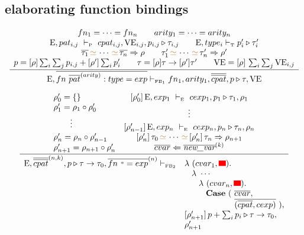 \documentclass[11pt,a4paper]{article}
\newcommand{\key}[1]{\textrm{\textbf{#1}}}
\newcommand{\qualtype}[2]{#1 \triangleright #2}
\newcommand{\unifylist}[3]{#1\,{\color{brown}{\simeq}}\,\cdots\,{\color{brown}{\simeq}}\,#2 \Rightarrow #3}
\newcommand{\subst}[2]{[#1]\,#2}
\newcommand{\braced}[1]{\{#1\}}
\newcommand{\wildcard}{{\color{gray}\scriptstyle\textbf{*}}}
\newcommand{\compose}[2]{#1 \circ #2}
\newcommand{\Env}  {\textrm{E}}
\newcommand{\VE}   {\textrm{VE}}
\newcommand{\sType} {\textrm{\tiny T}}
\newcommand{\sFB}   {\textrm{\tiny FB}}
\newcommand{\lam}  {\mathbf\lambda}
\newcommand{\Empty}{\braced{}}
\newcommand{\vdashE}  {\ \vdash_{\textrm{\tiny E}}\  }
\newcommand{\vdashP}  {\ \vdash_{\textrm{\tiny P}}\  }
\newcommand{\corenew}[1]{\textit{new\_#1}}
\newcommand{\vect}[1]{\overline{#1}}
\newcommand{\TODO}{{\color{red}\rule{2ex}{1.5ex}}}
\begin{document}
\subsection{elaborating function bindings}
\[
\cfrac
 {\begin{array}{c}
  fn_1=\cdots=fn_n \qquad arity_1=\cdots=arity_n                                \\
  \Env,pat_{i,j}  \vdashP  cpat_{i,j},\VE_{i,j},\qualtype{p_{i,j}}{\tau_{i,j}}  \qquad
  \Env,type_i \vdash_\sType \qualtype{p_i'}{\tau_i'}                            \\
  \unifylist{\vect{\tau_1}}{\vect{\tau_n}}{\rho}                                \qquad
  \unifylist{\tau_1'}{\tau_n'}{\rho'}                                           \\
  p = [\rho]\sum_i\sum_j p_{i,j} + [\rho']\sum_i p_i' \qquad
  \tau = [\rho]\tau\to[\rho']\tau'          \qquad
  \VE = \subst{\rho}{\sum_i \sum_j \VE_{i,j}}
  \end{array}}
 {\Env, \vect{fn\ \vect{pat}^{(arity)}:type = exp} \vdash_{\sFB_1} 
  fn_1, arity_1, \vect{\vect{cpat}},\qualtype{p}{\tau},\VE}
\]

\[
\cfrac
 {\begin{array}{lc}
  \rho'_0 = \Empty 
  & \subst{\rho'_0}\Env, exp_1 \vdashE cexp_1,\qualtype{p_1}{\tau_1},\rho_1 \\
  \rho'_1 = \compose{\rho_1}{\rho'_0} & \multirow{2}{*}{\vdots} \\
  \multirow{2}{*}{\qquad\vdots}  &  \\
  & \subst{\rho'_{n-1}}\Env, exp_n \vdashE cexp_n,\qualtype{p_n}{\tau_n},\rho_n \\
  \rho'_n = \compose{\rho_n}{\rho'_{n-1}}
  & \unifylist{\subst{\rho'_n}{\tau_0}}{\subst{\rho'_n}{\tau_n}}{\rho_{n+1}} \\ 
  \rho'_{n+1} = \compose{\rho_{n+1}}{\rho'_n}
  & \vect{cvar} \Leftarrow \vect{\corenew{var}}^{(k)} \\
  \end{array}
 }
 {\begin{array}{ll}
  \Env,\vect{\vect{cpat}}^{(n,k)},\qualtype{p}{\tau\to\tau_0},\vect{fn\ \wildcard = exp}^{(n)} \vdash_{\sFB_2}
   & \lam\ (cvar_1, \TODO).                     \\
   & \hspace{2ex}\lam\ \cdots                   \\
   & \hspace{4ex}\lam\ (cvar_n, \TODO).         \\
   & \hspace{6ex}\key{Case}\ (\ \vect{cvar},    \\
   & \hspace{14ex}\vect{(\vect{cpat}, cexp)}\ ),\\
   & \subst{\rho'_{n+1}}{\qualtype{p+\sum_i p_i}{\tau\to\tau_0}}, \\
   & \rho'_{n+1} \\
  \end{array}}
\]
\end{document}
